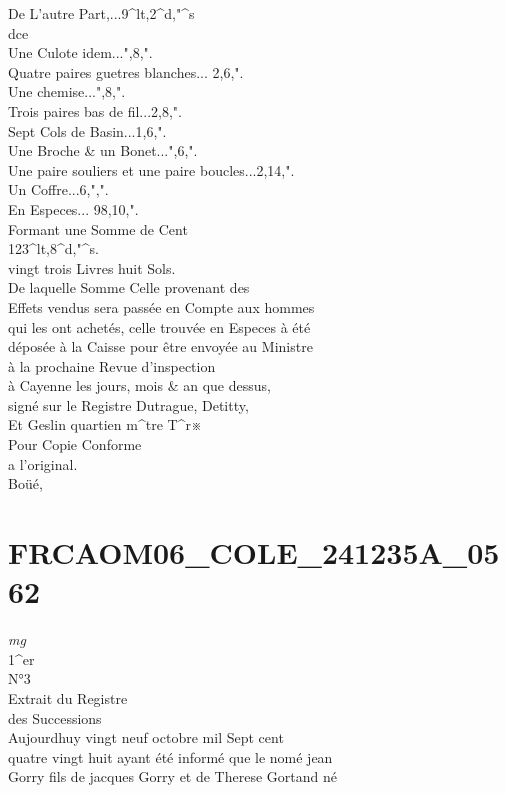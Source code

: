 \documentclass{article}
\begin{document}
\begin{pages}
De L'autre Part,...9\^{}lt,2\^{}d,"\^{}s\\
dce\\
Une Culote idem...",8,".\\
Quatre paires guetres blanches... 2,6,".\\
Une chemise...",8,".\\
Trois paires bas de fil...2,8,".\\
Sept Cols de Basin...1,6,".\\
Une Broche \& un Bonet...",6,".\\
Une paire souliers et une paire boucles...2,14,".\\
Un Coffre...6,",".\\
En Especes... 98,10,".\\
Formant une Somme de Cent\\
123\^{}lt,8\^{}d,"\^{}s.\\
vingt trois Livres huit Sols.\\
De laquelle Somme Celle provenant des\\
Effets vendus sera passée en Compte aux hommes\\
qui les ont achetés, celle trouvée en Especes à été\\
déposée à la Caisse pour être envoyée au Ministre\\
à la prochaine Revue d'inspection\\
à Cayenne les jours, mois \& an que dessus,\\
signé sur le Registre Dutrague, Detitty,\\
Et Geslin quartien m\^{}tre T\^{}r※\\
Pour Copie Conforme\\
a l'original.\\
Boüé,
\pend
\endnumbering\beginnumbering\section{FRCAOM06\_COLE\_241235A\_0562}
\vspace{0.5cm}\noindent
\textit{mg}
\footnotesize \\
1\^{}er\\
N°3
\normalsize \pstart
\\
Extrait du Registre\\
des Successions\\
Aujourdhuy vingt neuf octobre mil Sept cent\\
quatre vingt huit ayant été informé que le nomé jean\\
Gorry fils de jacques Gorry et de Therese Gortand né\\

\end{pages}
\end{document}
